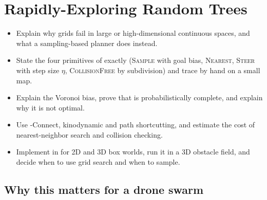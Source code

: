 \chapter{Rapidly-Exploring Random Trees}
\label{ch:ch16}

\begin{objectives}
\begin{itemize}
  \item Explain why grids fail in large or high-dimensional continuous spaces, and what a sampling-based planner does instead.
  \item State the four primitives of \rrt exactly (\textsc{Sample} with goal bias, \textsc{Nearest}, \textsc{Steer} with step size $\eta$, \textsc{CollisionFree} by subdivision) and trace \rrt by hand on a small map.
  \item Explain the Voronoi bias, prove that \rrt is probabilistically complete, and explain why it is not optimal.
  \item Use \rrt-Connect, kinodynamic \rrt and path shortcutting, and estimate the cost of nearest-neighbor search and collision checking.
  \item Implement \rrt in \python for 2D and 3D box worlds, run it in a 3D obstacle field, and decide when to use grid search and when to sample.
\end{itemize}
\end{objectives}

\section{Why this matters for a drone swarm}
\label{sec:ch16-motivation}

